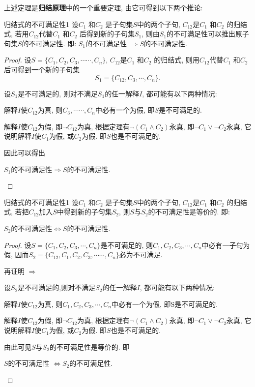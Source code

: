 上述定理是\textbf{归结原理}中的一个重要定理, 由它可得到以下两个推论:
\begin{myprop}{归结式的不可满足性}{1}
    设$C_1$ 和$C_2$ 是子句集$S$中的两个子句, $C_{1 2}$是$C_1$ 和$C_2$ 的归结式, 若用$C_{1 2}$代替$C_1$ 和$C_2$ 后得到新的子句集$S_1$, 则由$S_1$的不可满足性可以推出原子句集$S$的不可满足性. 即: $S_1$的不可满足性 $\Rightarrow  S$的不可满足性.
\end{myprop}
\begin{proof}
    设$S=\{ C_1 , C_2 , C_3, \cdots \cdots , C_n\}$, $C_{1 2}$是$C_1$ 和$C_2$ 的归结式, 则用$C_{1 2}$代替$C_1$ 和$C_2$ 后可得到一个新的子句集$$S_1=\{C_{1 2}, C_3, \cdots , C_n\}.$$

设$S_1$是不可满足的, 则对不满足$S_1$的任一解释$I$, 都可能有以下两种情况:

  解释$I$使$C_{1 2}$为真, 则$C_3, \cdots \cdots , C_n$中必有一个为假, 即$S$是不可满足的.

  解释$I$使$C_{1 2}$为假, 即$\neg C_{1 2}$为真, 根据定理\label{AIthm3.1}有$\neg  (C_1 \wedge C_2 )$永真, 即$\neg C_1 \vee \neg C_2 $永真, 它说明解释$I$使$C_1$为假, 或$C_2$为假. 即$S$也是不可满足的.

因此可以得出
\begin{center}
  $S_1$的不可满足性$\Rightarrow S$的不可满足性.
\end{center}
\end{proof}
\begin{myprop}{归结式的不可满足性}{1}
    设$C_1$ 和$C_2$ 是子句集$S$中的两个子句, $C_{1 2}$是$C_1$ 和$C_2$ 的归结式, 若把$C_{1 2}$加入$S$中得到新的子句集$S_2$, 则$S$与$S_2$的不可满足性是等价的. 即:
\begin{center}
  $S_2$的不可满足性$\Leftrightarrow S$的不可满足性.
\end{center}\end{myprop}
\begin{proof}
设$S=\{ C_1, C_2, C_3, \cdots , C_n\}$是不可满足的, 则$C_1, C_2, C_3, \cdots , C_n$中必有一子句为假, 因而$S_2=\{ C_{12}, C_1, C_2, C_3, \cdots \cdots , C_n\}$必为不可满足.

再证明 $\Rightarrow$

设$S_2$是不可满足的,则对不满足$S_2$的任一解释$I$, 都可能有以下两种情况:

     \quad{} 解释$I$使$C_{1 2}$为真, 则$C_1, C_2, C_3, \cdots , C_n$中必有一个为假, 即S是不可满足的.

     \quad{} 解释$I$使$C_{1 2}$为假, 即$\neg C_{1 2}$为真, 根据定理\label{AIthm3.2}有$\neg (C_1 \wedge C_2 )$永真, 即$\neg C_1 \vee \neg C_2 $永真, 它说明解释$I$使$C_1$为假, 或$C_2$为假. 即$S$也是不可满足的.

     由此可见$S$与$S_2$的不可满足性是等价的. 即
     \begin{center}
     	$S$的不可满足性 $\Leftrightarrow  S_2$的不可满足性.
     \end{center}
\end{proof}


